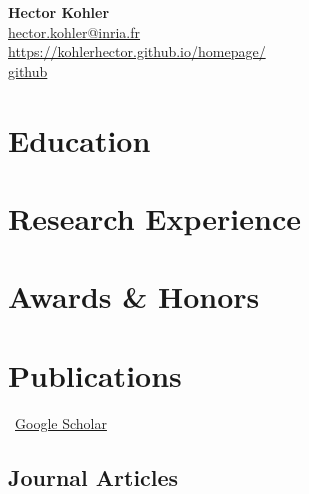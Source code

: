\documentclass[11pt]{article} %
\newcommand{\mytitle}[4]{
  \begin{center}
    \Large\textbf{#1}\normalsize \\ %
    \href{mailto:#2}{#2} \\ %
    \href{https://#3}{#3} \\ %
    #4 %
  \end{center}
}
\begin{document}
\mytitle{Hector Kohler}{hector.kohler@inria.fr}{https://kohlerhector.github.io/homepage/}{\href{https://github.com/KohlerHECTOR/}{github}} %


\RaggedRight


\section*{Education}


\section*{Research Experience}
\label{exp_research}


\section*{Awards \& Honors}
\label{awards}



\section*{Publications}
\label{pubs}

\vspace{-.75em}
\small
\faGoogle~\href{https://scholar.google.com/citations?user=aSO7bZ0AAAAJ&hl=en}{Google Scholar}\\
\normalsize


\subsection*{Journal Articles}
\label{journal-article}
\newrefcontext[labelprefix=J] %
\nocite{*}%
\printbibliography[
    type=article, %
    heading=none, %
    resetnumbers=true, %
    keyword=J %
]
\end{document}
